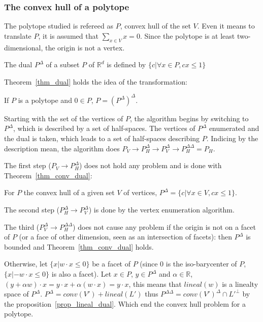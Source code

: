 \subsubsection{The convex hull of a polytope}
The polytope studied is refereed as $P$, convex hull of the set $V$. Even it means to translate $P$, it is assumed that $\sum_{x\in V} x = 0 $. Since the polytope is at least two-dimensional, the origin is not a vertex. 

\begin{definition}
The dual $P^\Delta$ of a subset $P$ of $\mathbb{R}^d$ is defined by $\{c | \forall x \in P, cx\leq 1  \}$
\end{definition}

Theorem~\ref{thm_dual} holds the idea of the transformation:

\begin{theorem}
If $P$ is a polytope and $0\in P$, $P=(P^\Delta)^\Delta$.
\label{thm_dual}
\end{theorem}

Starting with the set of the vertices of $P$, the algorithm begins by switching to $P^\Delta$, which is described by a set of half-spaces. The vertices of $P^\Delta$ enumerated and the dual is taken, which leads to a set of half-spaces describing $P$. Indicing by the description mean, the algorithm does $ P_V \rightarrow P_H^\Delta \rightarrow P_V^\Delta \rightarrow P_H^{\Delta\Delta} = P_H $. 

The first step ($P_V \rightarrow P_H^\Delta$) does not hold any problem and is done with Theorem~\ref{thm_conv_dual}:
\begin{theorem}
For $P$ the convex hull of a given set $V$ of vertices, $P^\Delta=\{c | \forall x \in V, cx\leq 1\}$.
\label{thm_conv_dual}
\end{theorem}
The second step ($P_H^\Delta \rightarrow P_V^\Delta$) is done by the vertex enumeration algorithm. 

The third ($P_V^\Delta \rightarrow P_H^{\Delta\Delta}$) does not cause any problem if the origin is not on a facet of $P$ (or a face of other dimension, seen as an intersection of facets): then $P^\Delta$ is bounded and Theorem~\ref{thm_conv_dual} holds.

Otherwise, let $\{x|w\cdot x \leq 0\}$ be a facet of $P$ (since $0$ is the iso-barycenter of $P$, $\{x| -w\cdot x \leq 0\}$ is also a facet). Let $x\in P$, $y\in P^\Delta$ and $\alpha\in\mathbb{R}$, $(y+\alpha w)\cdot x=y\cdot x+\alpha(w\cdot x)=y\cdot x$, this means that $lineal(w)$ is a linealty space of $P^\Delta$. $P^\Delta=conv(V')+lineal(L')$ thus $P^{\Delta\Delta}=conv(V')^\Delta \cap L'^\bot$ by the proposition~\ref{prop_lineal_dual}. Which end the convex hull problem for a polytope.

